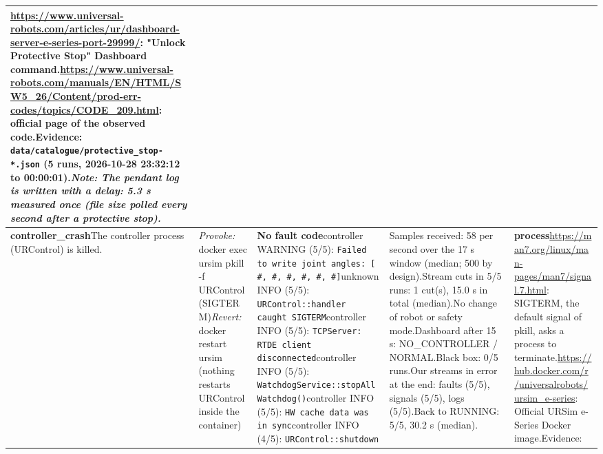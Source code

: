 \documentclass[10pt]{article}
\begin{document}
\begin{longtable}{@{}>{\raggedright\arraybackslash}p{2.7cm}>{\raggedright\arraybackslash}p{4.0cm}>{\raggedright\arraybackslash}p{7.6cm}>{\raggedright\arraybackslash}p{5.2cm}>{\raggedright\arraybackslash}p{6.0cm}@{}}
\url{https://www.universal-robots.com/articles/ur/dashboard-server-e-series-port-29999/}: "Unlock Protective Stop" Dashboard command.\newline \url{https://www.universal-robots.com/manuals/EN/HTML/SW5_26/Content/prod-err-codes/topics/CODE_209.html}: official page of the observed code.\newline Evidence: \texttt{data/catalogue/protective\_\allowbreak{}stop-*.json} (5 runs, 2026-10-28 23:32:12 to 00:00:01).\newline \textit{Note: The pendant log is written with a delay: 5.3 s measured once (file size polled every second after a protective stop).} \\ \midrule
\textbf{controller\_\allowbreak{}crash}\newline The controller process (URControl) is killed. & \textit{Provoke:} docker exec ursim pkill -f URControl  (SIGTERM)\newline\textit{Revert:} docker restart ursim (nothing restarts URControl inside the container) & \textbf{No fault code}\newline \textsf{controller} WARNING (5/5): \texttt{Failed to write joint angles: [ \#,\allowbreak{} \#,\allowbreak{} \#,\allowbreak{} \#,\allowbreak{} \#,\allowbreak{} \#]}\newline \textsf{unknown} INFO (5/5): \texttt{URControl::handler caught SIGTERM}\newline \textsf{controller} INFO (5/5): \texttt{TCPServer: RTDE client disconnected}\newline \textsf{controller} INFO (5/5): \texttt{WatchdogService::stopAllWatchdog()}\newline \textsf{controller} INFO (5/5): \texttt{HW cache data was in sync}\newline \textsf{controller} INFO (4/5): \texttt{URControl::shutdown} & Samples received: 58 per second over the 17 s window (median; 500 by design).\newline Stream cuts in 5/5 runs: 1 cut(s), 15.0 s in total (median).\newline No change of robot or safety mode.\newline Dashboard after 15 s: NO\_\allowbreak{}CONTROLLER / NORMAL.\newline Black box: 0/5 runs.\newline Our streams in error at the end: faults (5/5), signals (5/5), logs (5/5).\newline Back to RUNNING: 5/5, 30.2 s (median). & \textbf{process}\newline \url{https://man7.org/linux/man-pages/man7/signal.7.html}: SIGTERM,\allowbreak{} the default signal of pkill,\allowbreak{} asks a process to terminate.\newline \url{https://hub.docker.com/r/universalrobots/ursim_e-series}: Official URSim e-Series Docker image.\newline Evidence: 
\end{longtable}
\end{document}
